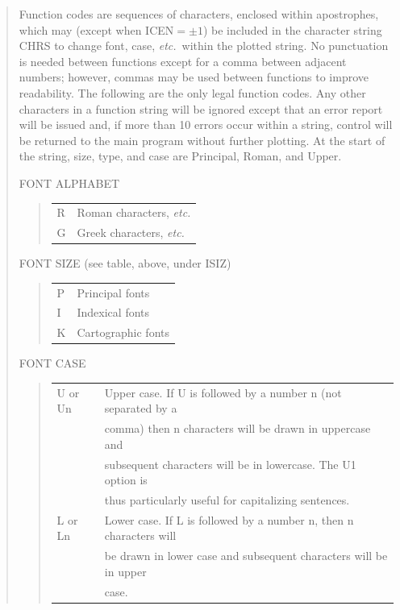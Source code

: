 \documentclass[twoside,11pt]{article}
\renewcommand{\_}{\texttt{\symbol{95}}}
\begin{document}
\begin{quote}
Function codes are sequences of characters, enclosed within
apostrophes, which may (except when ICEN$=\pm1$) be included in the
character string CHRS to change font, case, {\em etc.}\ within the plotted
string.
No punctuation is needed between functions except for a
comma between adjacent numbers;  however, commas may be used between
functions to improve readability.
The following are the only legal
function codes.
Any other characters in a function string will be
ignored except that an error report will be issued and, if more
than 10 errors occur within a string, control will be returned to
the main program without further plotting.
At the start of the
string, size, type, and case are Principal, Roman, and Upper.

FONT ALPHABET

\begin{quote}
\begin{tabular}{ll}
R & Roman characters, {\em etc.}\\
G & Greek characters, {\em etc.}
\end{tabular}
\end{quote}

FONT SIZE (see table, above, under ISIZ)

\begin{quote}
\begin{tabular}{ll}
P & Principal fonts\\
I & Indexical fonts\\
K & Cartographic fonts
\end{tabular}
\end{quote}

FONT CASE

\begin{quote}
\begin{tabular}{ll}
U or Un & Upper case.  If U is followed by a number n (not separated by a\\
 & comma) then n characters will be drawn in uppercase and\\
 & subsequent characters will be in lowercase.  The U1 option is\\
 & thus particularly useful for capitalizing sentences.\\
L or Ln & Lower case.  If L is followed by a number n, then n characters will\\
 & be drawn in lower case and subsequent characters will be in upper\\
 & case.
\end{tabular}
\end{quote}


\end{quote}
\end{document}
